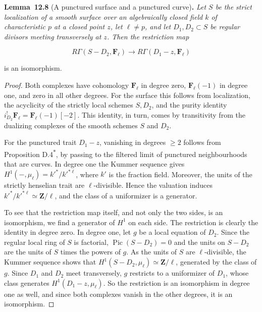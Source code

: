 \documentclass[11pt]{article}
\newenvironment{bpstatement}[2]{\par\addvspace{0.6\baselineskip}\noindent\textbf{#1}#2\textbf{.}\enspace\ignorespaces}
  {\par\addvspace{0.4\baselineskip}}
\newenvironment{bpstatementit}[2]{\begin{bpstatement}{#1}{#2}\itshape\ignorespaces}{\end{bpstatement}}
\newcommand{\bpout}[1]{#1\textsuperscript{\hyperlink{bp-outside}{\ensuremath{\ast}}}}
\begin{document}
\label{bp26}%
\begin{bpstatementit}{Lemma~12.8}{ (A punctured surface and a punctured curve)}
Let \(S\) be the strict localization of a smooth surface over an algebraically closed field \(k\) of characteristic \(p\) at a closed point \(z\), let \(\ell\neq p\), and let \(D_1,D_2\subset S\) be regular divisors meeting transversely at \(z\). Then the restriction map

\[
R\Gamma(S-D_2,\mathbf F_\ell)\longrightarrow R\Gamma(D_1-z,\mathbf F_\ell)
\]

is an isomorphism.
\end{bpstatementit}

\begin{proof}[{Proof}]\label{bp27}%
Both complexes have cohomology \(\mathbf F_\ell\) in degree zero, \(\mathbf F_\ell(-1)\) in degree one, and zero in all other degrees. For the surface this follows from localization, the acyclicity of the strictly local schemes \(S,D_2\), and the purity identity \(i_{D_2}^!\mathbf F_\ell=\mathbf F_\ell(-1)[-2]\). This identity, in turn, comes by transitivity from the dualizing complexes of the smooth schemes \(S\) and \(D_2\).

For the punctured trait \(D_1-z\), vanishing in degrees \(\geq2\) follows from Proposition \bpout{D.4}, by passing to the filtered limit of punctured neighbourhoods that are curves. In degree one the Kummer sequence gives \(H^1(-,\mu_\ell)=k'^*/k'^{*\ell}\), where \(k'\) is the fraction field. Moreover, the units of the strictly henselian trait are \(\ell\)-divisible. Hence the valuation induces \(k'^*/k'^{*\ell}\simeq\mathbf Z/\ell\), and the class of a uniformizer is a generator.

To see that the restriction map itself, and not only the two sides, is an isomorphism, we find a generator of \(H^1\) on each side. The restriction is clearly the identity in degree zero. In degree one, let \(g\) be a local equation of \(D_2\). Since the regular local ring of \(S\) is factorial, \(\operatorname{Pic}(S-D_2)=0\) and the units on \(S-D_2\) are the units of \(S\) times the powers of \(g\). As the units of \(S\) are \(\ell\)-divisible, the Kummer sequence shows that \(H^1(S-D_2,\mu_\ell)\simeq\mathbf Z/\ell\), generated by the class of \(g\). Since \(D_1\) and \(D_2\) meet transversely, \(g\) restricts to a uniformizer of \(D_1\), whose class generates \(H^1(D_1-z,\mu_\ell)\). So the restriction is an isomorphism in degree one as well, and since both complexes vanish in the other degrees, it is an isomorphism.
\end{proof}
\end{document}
